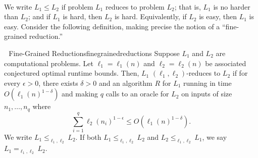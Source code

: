         \\
        We write \(L_1\leq L_2\) if problem \(L_1\) reduces to problem \(L_2\); that is, \(L_1\) is no harder than \(L_2\); and if \(L_1\) is hard, then \(L_2\) is hard. Equivalently, if \(L_2\) is easy, then \(L_1\) is easy. Consider the following definition, making precise the notion of a ``fine-grained reduction.''
        \begin{definition}{\Stop\,\,\cite{williams2019finegrained} Fine-Grained Reductions}{finegrainedreductions}
            Suppose \(L_1\) and \(L_2\) are computational problems. Let \(\ell_1=\ell_1(n)\) and \(\ell_2=\ell_2(n)\) be associated conjectured optimal runtime bounds. Then, \(L_1\) \((\ell_1,\ell_2)\)-reduces to \(L_2\) if for every \(\epsilon>0\), there exists \(\delta>0\) and an algorithm \(R\) for \(L_1\) running in time \(O(\ell_1(n)^{1-\delta})\) and making \(q\) calls to an oracle for \(L_2\) on inputs of size \(n_1,\ldots,n_q\) where
            \begin{equation*}
                \sum_{i=1}^q \ell_2(n_i)^{1-\epsilon}\leq O(\ell_1(n)^{1-\delta}).
            \end{equation*}
            We write \(L_1\leq_{\ell_1,\ell_2} L_2\). If both \(L_1\leq_{\ell_1,\ell_2} L_2\) and \(L_2\leq_{\ell_1,\ell_2} L_1\), we say \(L_1=_{\ell_1,\ell_2}L_2\).
        \end{definition}
        \pagebreak
